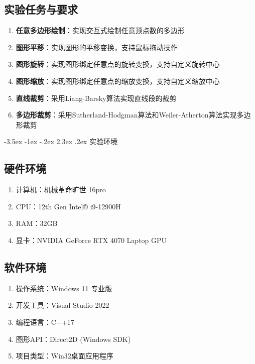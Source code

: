 \documentclass[12pt,a4paper]{article}
\makeatletter
\renewcommand\section{\@startsection{section}{1}{\z@}%
    {-3.5ex \@plus -1ex \@minus -.2ex}%
    {2.3ex \@plus.2ex}%
    {\normalfont\Large\bfseries\songti}}
\makeatother
\begin{document}
\subsection{实验任务与要求}

\begin{tcolorbox}
\begin{enumerate}
    \item \textbf{任意多边形绘制}：实现交互式绘制任意顶点数的多边形
    \item \textbf{图形平移}：实现图形的平移变换，支持鼠标拖动操作
    \item \textbf{图形旋转}：实现图形绑定任意点的旋转变换，支持自定义旋转中心
    \item \textbf{图形缩放}：实现图形绑定任意点的缩放变换，支持自定义缩放中心
    \item \textbf{直线裁剪}：采用Liang-Barsky算法实现直线段的裁剪
    \item \textbf{多边形裁剪}：采用Sutherland-Hodgman算法和Weiler-Atherton算法实现多边形裁剪
\end{enumerate}
\end{tcolorbox}

\clearpage

\section{实验环境}
\begin{tcolorbox}
\subsection{硬件环境}

\begin{enumerate}
    \item 计算机：机械革命旷世 16pro
    \item CPU：12th Gen Intel® i9-12900H
    \item RAM：32GB
    \item 显卡：NVIDIA GeForce RTX 4070 Laptop GPU
\end{enumerate}

\subsection{软件环境}

\begin{enumerate}
    \item 操作系统：Windows 11 专业版
    \item 开发工具：Visual Studio 2022
    \item 编程语言：C++17
    \item 图形API：Direct2D (Windows SDK)
    \item 项目类型：Win32桌面应用程序
\end{enumerate}
\end{tcolorbox}
\end{document}
